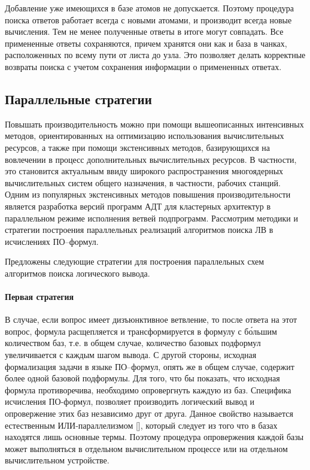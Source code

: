 Добавление уже имеющихся в базе атомов не допускается. Поэтому процедура поиска ответов работает всегда с новыми атомами, и производит всегда новые вычисления. Тем не менее полученные ответы в итоге могут совпадать. Все примененные ответы сохраняются, причем хранятся они как и база в чанках, расположенных по всему пути от листа до узла. Это позволяет делать корректные возвраты поиска с учетом сохранения информации о примененных ответах.


\subsection{Параллельные стратегии}

Повышать производительность можно при помощи вышеописанных интенсивных методов, ориентированных на оптимизацию использования вычислительных ресурсов, а также при помощи экстенсивных методов, базирующихся на вовлечении в процесс дополнительных вычислительных ресурсов. В частности, это становится актуальным ввиду широкого распространения многоядерных вычислительных систем общего назначения, в частности, рабочих станций. Одним из популярных экстенсивных методов повышения производительности является разработка версий программ АДТ для кластерных архитектур в параллельном режиме исполнения ветвей подпрограмм. Рассмотрим методики и стратегии построения параллельных реализаций алгоритмов поиска ЛВ в исчислениях ПО--формул.

Предложены следующие стратегии для построения параллельных схем алгоритмов поиска логического вывода.

\paragraph{Первая стратегия}

В случае, если вопрос имеет дизъюнктивное ветвление, то после ответа на этот вопрос, формула расщепляется и трансформируется в формулу с б\'{о}льшим количеством баз, т.е. в общем случае, количество базовых подформул увеличивается с каждым шагом вывода. С другой стороны, исходная формализация задачи в языке ПО--формул, опять же в общем случае, содержит более одной базовой подформулы. Для того, что бы показать, что исходная формула противоречива, необходимо опровергнуть каждую из баз. Специфика исчисления ПО-формул, позволяет производить логический вывод и опровержение этих баз независимо друг от друга. Данное свойство называется естественным ИЛИ-параллелизмом [], который следует из того что в базах находятся лишь основные термы. Поэтому процедура опровержения каждой базы может выполняться в отдельном вычислительном процессе или на отдельном вычислительном устройстве.

